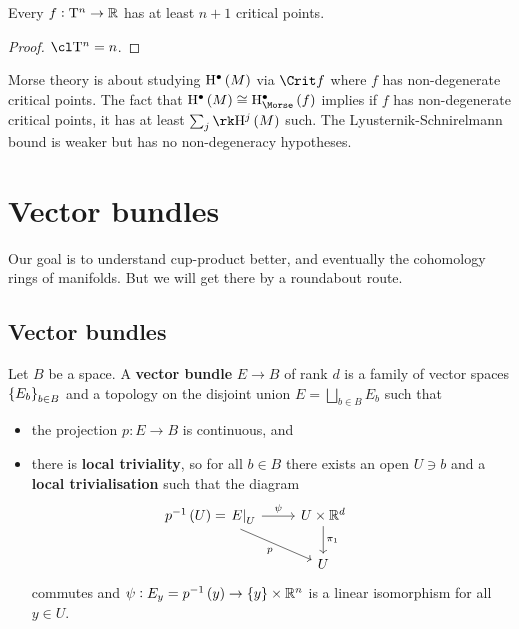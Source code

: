 \begin{corollary}
Every $ f : \mathrm{T}^n \to \mathbb{R} $ has at least $ n + 1 $ critical points.
\end{corollary}

\begin{proof}
$ \cl \T^n = n $.
\end{proof}

\begin{remark*}
Morse theory is about studying $ \H^\bullet\br{M} $ via $ \Crit f $ where $ f $ has non-degenerate critical points. The fact that $ \H^\bullet\br{M} \cong \H_{\Morse}^\bullet\br{f} $ implies if $ f $ has non-degenerate critical points, it has at least $ \sum_j \rk \H^j\br{M} $ such. The Lyusternik-Schnirelmann bound is weaker but has no non-degeneracy hypotheses.
\end{remark*}

\pagebreak

\section{Vector bundles}


Our goal is to understand cup-product better, and eventually the cohomology rings of manifolds. But we will get there by a roundabout route.

\subsection{Vector bundles}

\begin{definition*}
Let $ B $ be a space. A \textbf{vector bundle} $ E \to B $ of rank $ d $ is a family of vector spaces $ \cbr{E_b}_{b \in B} $ and a topology on the disjoint union $ E = \bigsqcup_{b \in B} E_b $ such that
\begin{itemize}
\item the projection $ p : E \to B $ is continuous, and
\item there is \textbf{local triviality}, so for all $ b \in B $ there exists an open $ U \ni b $ and a \textbf{local trivialisation} such that the diagram
$$
\begin{tikzcd}
p^{-1}\br{U} = \eval{E}_U \arrow{r}{\psi} \arrow{dr}[swap]{p} & U \times \RR^d \arrow{d}{\pi_1} \\
& U &
\end{tikzcd}
$$
commutes and $ \psi : E_y = p^{-1}\br{y} \to \cbr{y} \times \RR^n $ is a linear isomorphism for all $ y \in U $.
\end{itemize}
\end{definition*}

